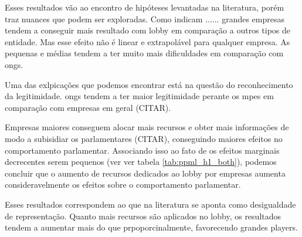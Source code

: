 Esses resultados vão ao encontro de hipóteses levantadas na literatura, porém traz nuances que podem ser exploradas. Como indicam ...... grandes empresas tendem a conseguir mais resultado com lobby em comparação a outros tipos de entidade. Mas esse efeito não é linear e extrapolável para qualquer empresa. As pequenas e médias tendem a ter muito mais dificuldades em comparação com \acrshort{ong}s. 

Uma das exlpicações que podemos encontrar está na questão do reconhecimento da legitimidade. \acrshort{ong}s tendem a ter maior legitimidade perante os \acrshort{mpe}s em comparação com empresas em geral (CITAR). 

Empresas maiores conseguem alocar mais recursos e obter mais informações de modo a subisidiar os parlamentares (CITAR), conseguindo maiores efeitos no comportamento parlamentar. Associando isso ao fato de os efeitos marginais decrecentes serem pequenos (ver ver tabela \ref{tab:ppml_h1_both}), podemos concluir que o aumento de recursos dedicados ao lobby por empresas aumenta consideravelmente os efeitos sobre o comportamento parlamentar.

Esses resultados correspondem ao que na literatura se aponta como desigualdade de representação. Quanto mais recursos são aplicados no lobby, os resultados tendem a aumentar mais do que prpoporcinalmente, favorecendo grandes players.